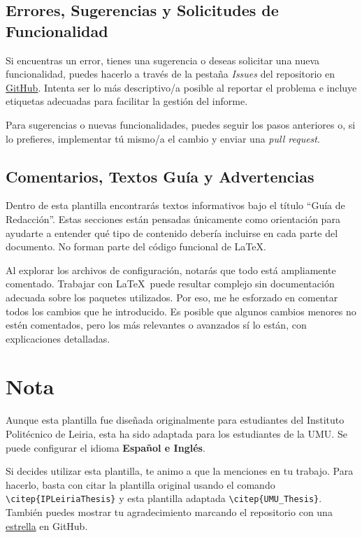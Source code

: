 \subsection{Errores, Sugerencias y Solicitudes de Funcionalidad}

Si encuentras un error, tienes una sugerencia o deseas solicitar una nueva funcionalidad, puedes hacerlo a través de la pestaña \textit{Issues} del repositorio en \href{https://github.com/enriiquee/umu-thesis}{GitHub}. Intenta ser lo más descriptivo/a posible al reportar el problema e incluye etiquetas adecuadas para facilitar la gestión del informe.

Para sugerencias o nuevas funcionalidades, puedes seguir los pasos anteriores o, si lo prefieres, implementar tú mismo/a el cambio y enviar una \textit{pull request}. 

\subsection{Comentarios, Textos Guía y Advertencias}

Dentro de esta plantilla encontrarás textos informativos bajo el título ``Guía de Redacción''. Estas secciones están pensadas únicamente como orientación para ayudarte a entender qué tipo de contenido debería incluirse en cada parte del documento. No forman parte del código funcional de \LaTeX.

Al explorar los archivos de configuración, notarás que todo está ampliamente comentado. Trabajar con \LaTeX~puede resultar complejo sin documentación adecuada sobre los paquetes utilizados. Por eso, me he esforzado en comentar todos los cambios que he introducido. Es posible que algunos cambios menores no estén comentados, pero los más relevantes o avanzados sí lo están, con explicaciones detalladas.

\section{Nota}

Aunque esta plantilla fue diseñada originalmente para estudiantes del Instituto Politécnico de Leiria, esta  ha sido adaptada para los estudiantes de la UMU. Se puede configurar el idioma \textbf{Español e Inglés}.

Si decides utilizar esta plantilla, te animo a que la menciones en tu trabajo. Para hacerlo, basta con citar la plantilla original usando el comando \verb|\citep{IPLeiriaThesis}| y esta plantilla adaptada \verb|\citep{UMU_Thesis}|. También puedes mostrar tu agradecimiento marcando el repositorio con una \href{https://github.com/enriiquee/umu-thesis}{estrella} en GitHub. 
